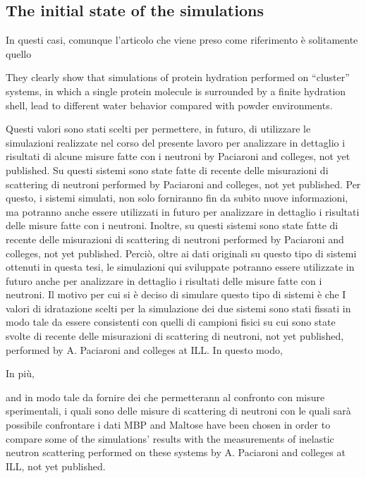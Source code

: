 \subsection{The initial state of the simulations}



In questi casi, comunque l'articolo che viene preso come riferimento è solitamente quello 

 They clearly show that simulations of protein hydration performed on ``cluster'' systems, in which a single protein molecule is surrounded by a finite hydration shell, lead to different water behavior compared with powder environments. 


Questi valori sono stati scelti per permettere, in futuro, di utilizzare le simulazioni realizzate nel corso del presente lavoro per analizzare in dettaglio i risultati di alcune misure fatte con i neutroni by Paciaroni and colleges, not yet published.
Su questi sistemi sono state fatte di recente delle misurazioni di scattering di neutroni performed by Paciaroni and colleges, not yet published. Per questo, i sistemi simulati, non solo forniranno fin da subito nuove informazioni, ma potranno anche essere utilizzati in futuro per analizzare in dettaglio i risultati delle misure fatte con i neutroni.
 Inoltre, su questi sistemi sono state fatte di recente delle misurazioni di scattering di neutroni performed by Paciaroni and colleges, not yet published. Perciò, oltre ai dati originali su questo tipo di sistemi ottenuti in questa tesi, le simulazioni qui sviluppate potranno essere utilizzate in futuro anche per analizzare in dettaglio i risultati delle misure fatte con i neutroni. 
Il motivo per cui si è deciso di simulare questo tipo di sistemi è che 
I valori di idratazione scelti per la simulazione dei due sistemi sono stati fissati in modo tale da essere consistenti con quelli di campioni fisici su cui sono state svolte di recente delle misurazioni di scattering di neutroni, not yet published, performed by A. Paciaroni and colleges at ILL. In questo modo, 

 In più, 

and 
in modo tale da fornire dei che permetterann al confronto con misure sperimentali, i quali sono  delle misure di scattering di neutroni con le quali sarà possibile confrontare i dati
MBP and Maltose have been chosen in order to compare some of the simulations' results with the measurements of inelastic neutron scattering performed on these systems by A. Paciaroni and colleges at ILL, not yet published.


